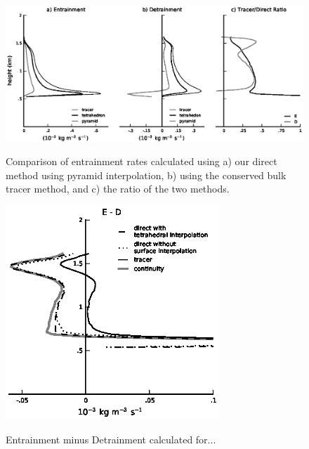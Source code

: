 \documentclass[12pt]{article}
\begin{document}
\begin{figure}[t]
  \noindent\includegraphics[width=40pc,angle=0]{./figures/direct_vs_tracer_core.eps}\\
  \caption{Comparison of entrainment rates calculated using a) our direct method 
using pyramid interpolation, b) using the conserved bulk tracer method, and 
c) the ratio of the two methods.}\label{fig:direct_vs_tracer}
\end{figure}

\begin{figure}[t]
  \noindent\includegraphics[width=19pc,angle=0]{./figures/E_minus_D_core.eps}\\
  \caption{Entrainment minus Detrainment calculated for...}\label{fig:E_minus_D}
\end{figure}
\end{document}
